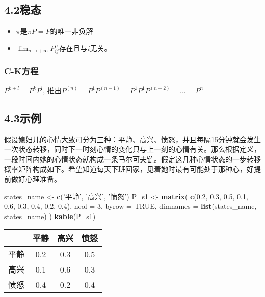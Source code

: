 \documentclass[]{article}
\newenvironment{Shaded}{\begin{snugshade}}{\end{snugshade}}
\newcommand{\KeywordTok}[1]{\textcolor[rgb]{0.13,0.29,0.53}{\textbf{#1}}}
\newcommand{\DataTypeTok}[1]{\textcolor[rgb]{0.13,0.29,0.53}{#1}}
\newcommand{\DecValTok}[1]{\textcolor[rgb]{0.00,0.00,0.81}{#1}}
\newcommand{\FloatTok}[1]{\textcolor[rgb]{0.00,0.00,0.81}{#1}}
\newcommand{\StringTok}[1]{\textcolor[rgb]{0.31,0.60,0.02}{#1}}
\newcommand{\OtherTok}[1]{\textcolor[rgb]{0.56,0.35,0.01}{#1}}
\newcommand{\NormalTok}[1]{#1}
\providecommand{\tightlist}{%
  \setlength{\itemsep}{0pt}\setlength{\parskip}{0pt}}
\begin{document}
\subsection{4.2稳态}

\begin{itemize}
\tightlist
\item
  \(\pi\)是\(\pi P = P\)的唯一非负解
\item
  \(\lim_{n\rightarrow+\infty}P_{ij}^n\)存在且与\(i\)无关。
\end{itemize}

\subsubsection{C-K方程}\label{c-k}

\(P^{k + l} = P^kP^l\),
推出\(P^{(n)} = P^1P^{(n-1)}=P^1P^1P^{(n-2)}=...=P^n\)

\subsection{4.3示例}

假设媳妇儿的心情大致可分为三种：平静、高兴、愤怒，并且每隔15分钟就会发生一次状态转移，同时下一时刻心情的变化只与上一刻的心情有关。那么根据定义，一段时间内她的心情状态就构成一条马尔可夫链。假定这几种心情状态的一步转移概率矩阵构成如下。希望知道每天下班回家，见着她时最有可能处于那种心，好提前做好心理准备。

\begin{Shaded}
\begin{Highlighting}[]
\NormalTok{states_name <-}\StringTok{ }\KeywordTok{c}\NormalTok{(}\StringTok{'平静'}\NormalTok{, }\StringTok{'高兴'}\NormalTok{, }\StringTok{'愤怒'}\NormalTok{)}
\NormalTok{P_s1 <-}\StringTok{ }\KeywordTok{matrix}\NormalTok{(}
  \KeywordTok{c}\NormalTok{(}\FloatTok{0.2}\NormalTok{, }\FloatTok{0.3}\NormalTok{, }\FloatTok{0.5}\NormalTok{, }\FloatTok{0.1}\NormalTok{, }\FloatTok{0.6}\NormalTok{, }\FloatTok{0.3}\NormalTok{, }\FloatTok{0.4}\NormalTok{, }\FloatTok{0.2}\NormalTok{, }\FloatTok{0.4}\NormalTok{), }\DataTypeTok{ncol =} \DecValTok{3}\NormalTok{, }\DataTypeTok{byrow =} \OtherTok{TRUE}\NormalTok{, }
  \DataTypeTok{dimnames =} \KeywordTok{list}\NormalTok{(states_name, states_name)}
\NormalTok{  )}
\KeywordTok{kable}\NormalTok{(P_s1)}
\end{Highlighting}
\end{Shaded}

\begin{longtable}[]{@{}lccc@{}}
\toprule
& 平静 & 高兴 & 愤怒\tabularnewline
\midrule
\endhead
平静 & 0.2 & 0.3 & 0.5\tabularnewline
高兴 & 0.1 & 0.6 & 0.3\tabularnewline
愤怒 & 0.4 & 0.2 & 0.4\tabularnewline
\bottomrule
\end{longtable}
\end{document}
